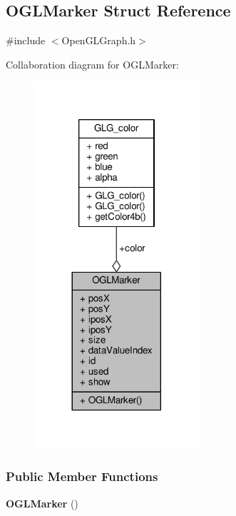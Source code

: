 \subsection{O\+G\+L\+Marker Struct Reference}
\label{structOGLMarker}


{\ttfamily \#include $<$Open\+G\+L\+Graph.\+h$>$}



Collaboration diagram for O\+G\+L\+Marker\+:
\nopagebreak
\begin{figure}[H]
\begin{center}
\leavevmode
\includegraphics[width=173pt]{d4/dd0/structOGLMarker__coll__graph}
\end{center}
\end{figure}
\subsubsection*{Public Member Functions}
\begin{DoxyCompactItemize}
\item 
{\bf O\+G\+L\+Marker} ()
\end{DoxyCompactItemize}
